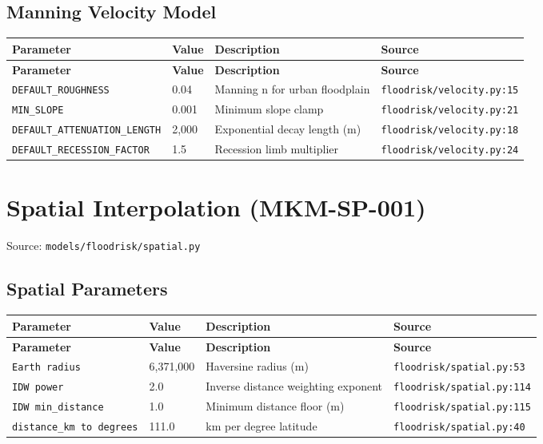 \documentclass[11pt,a4paper]{article}
\begin{document}
\subsection{Manning Velocity Model}

\begin{longtable}{p{4cm}p{4cm}p{5.5cm}p{3.5cm}}
    \toprule
    \textbf{Parameter} & \textbf{Value} & \textbf{Description} & \textbf{Source} \\
    \midrule
    \endfirsthead
    \toprule
    \textbf{Parameter} & \textbf{Value} & \textbf{Description} & \textbf{Source} \\
    \midrule
    \endhead
    \bottomrule
    \endfoot
    \texttt{DEFAULT\_ROUGHNESS} & 0.04 & Manning n for urban floodplain & {\scriptsize \texttt{floodrisk/velocity.py:15}} \\
    \texttt{MIN\_SLOPE} & 0.001 & Minimum slope clamp & {\scriptsize \texttt{floodrisk/velocity.py:21}} \\
    \texttt{DEFAULT\_ATTENUATION\_LENGTH} & 2,000 & Exponential decay length (m) & {\scriptsize \texttt{floodrisk/velocity.py:18}} \\
    \texttt{DEFAULT\_RECESSION\_FACTOR} & 1.5 & Recession limb multiplier & {\scriptsize \texttt{floodrisk/velocity.py:24}} \\
\end{longtable}

\clearpage

\section{Spatial Interpolation (MKM-SP-001)}

Source: \texttt{models/floodrisk/spatial.py}

\subsection{Spatial Parameters}

\begin{longtable}{p{4cm}p{4cm}p{5.5cm}p{3.5cm}}
    \toprule
    \textbf{Parameter} & \textbf{Value} & \textbf{Description} & \textbf{Source} \\
    \midrule
    \endfirsthead
    \toprule
    \textbf{Parameter} & \textbf{Value} & \textbf{Description} & \textbf{Source} \\
    \midrule
    \endhead
    \bottomrule
    \endfoot
    \texttt{Earth radius} & 6,371,000 & Haversine radius (m) & {\scriptsize \texttt{floodrisk/spatial.py:53}} \\
    \texttt{IDW power} & 2.0 & Inverse distance weighting exponent & {\scriptsize \texttt{floodrisk/spatial.py:114}} \\
    \texttt{IDW min\_distance} & 1.0 & Minimum distance floor (m) & {\scriptsize \texttt{floodrisk/spatial.py:115}} \\
    \texttt{distance\_km to degrees} & 111.0 & km per degree latitude & {\scriptsize \texttt{floodrisk/spatial.py:40}} \\
\end{longtable}
\end{document}
